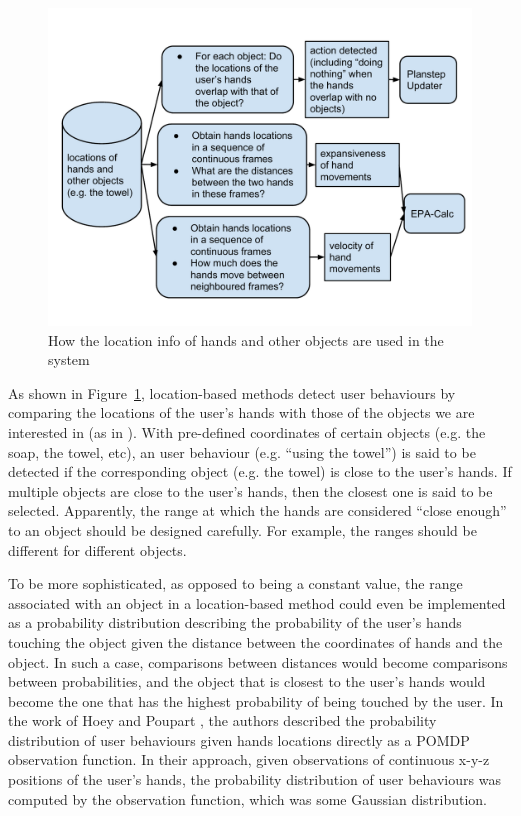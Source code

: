\begin{figure}[htp]
\centering
\includegraphics[trim = 4mm 13mm 2mm 14mm, clip, width=0.9\linewidth]{fig/fig-location-use.pdf}
\caption{How the location info of hands and other objects are used in the system}
\label{fig:location-use}
\end{figure}

As shown in Figure~\ref{fig:location-use}, location-based methods detect user behaviours by comparing the locations of the user's hands with those of the objects we are interested in (as in \cite{boger2005decision, czarnuch2014}). With pre-defined coordinates of certain objects (e.g. the soap, the towel, etc), an user behaviour (e.g. ``using the towel'') is said to be detected if the corresponding object (e.g. the towel) is close to the user's hands. If multiple objects are close to the user's hands, then the closest one is said to be selected. Apparently, the range at which the hands are considered ``close enough'' to an object should be designed carefully. For example, the ranges should be different for different objects. 

To be more sophisticated, as opposed to being a constant value, the range associated with an object in a location-based method could even be implemented as a probability distribution describing the probability of the user's hands touching the object given the distance between the coordinates of hands and the object. In such a case, comparisons between distances would become comparisons between probabilities, and the object that is closest to the user's hands would become the one that has the highest probability of being touched by the user. In the work of Hoey and Poupart \cite{hoey2005solving}, the authors described the probability distribution of user behaviours given hands locations directly as a POMDP observation function. In their approach, given observations of continuous x-y-z positions of the user's hands, the probability distribution of user behaviours was computed by the observation function, which was some Gaussian distribution.

